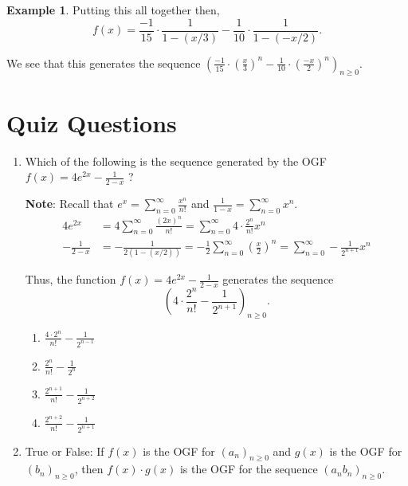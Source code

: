\documentclass{article}
\theoremstyle{definition}
\newtheorem{example}{Example}
\begin{document}
\begin{example}
Putting this all together then,
\[f(x)=\frac{-1}{15} \cdot \frac{1}{1-(x/3)}-\frac{1}{10} \cdot \frac{1}{1-(-x/2)}.\]

We see that this generates the sequence $\left(\frac{-1}{15} \cdot\left(\frac{x}{3}\right)^{n}-\frac{1}{10} \cdot\left(\frac{-x}{2}\right)^{n}\right)_{n \geq 0}$.
\end{example}








\newpage

\section*{Quiz Questions}
\begin{enumerate}
  \item Which of the following is the sequence generated by the OGF $f(x)=4 e^{2 x}-\frac{1}{2-x}$ ?

  \textbf{Note}: Recall that $e^{x}=\sum_{n=0}^{\infty} \frac{x^{n}}{n!}$ and $\frac{1}{1-x}=\sum_{n=0}^{\infty} x^{n}$.
  \begin{align*}
    4 e^{2 x} &= 4 \sum_{n=0}^{\infty} \frac{(2 x)^{n}}{n!} = \sum_{n=0}^{\infty} 4 \cdot \frac{2^{n}}{n!} x^{n} \\
    -\frac{1}{2-x} &= -\frac{1}{2(1-(x/2))} = -\frac{1}{2} \sum_{n=0}^{\infty} \left(\frac{x}{2}\right)^{n} = \sum_{n=0}^{\infty} -\frac{1}{2^{n+1}} x^{n}
  \end{align*}

  Thus, the function $f(x)=4 e^{2 x}-\frac{1}{2-x}$ generates the sequence 
  $$\left(4 \cdot \frac{2^{n}}{n!}-\frac{1}{2^{n+1}}\right)_{n \geq 0}.$$


  
  \begin{enumerate}
    \item $\frac{4 \cdot 2^n}{n!}-\frac{1}{2^{n-1}}$
    \item $\frac{2^n}{n!}-\frac{1}{2^n}$
    \item $\frac{2^{n+1}}{n!}-\frac{1}{2^{n+2}}$
    \item $\frac{2^{n+2}}{n!}-\frac{1}{2^{n+1}}$
  \end{enumerate}

  \item True or False: If $f(x)$ is the OGF for 
  $\left(a_n\right)_{n \geq 0}$ and $g(x)$ 
  is the OGF for $\left(b_n\right)_{n \geq 0}$, then 
  $f(x) \cdot g(x)$ is the OGF for the sequence $\left(a_n b_n\right)_{n \geq 0}$.


\end{enumerate}
\end{document}
